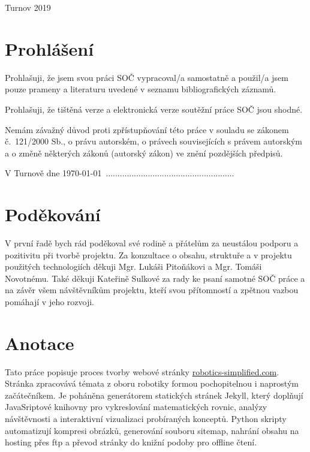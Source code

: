 \documentclass[a4paper, 12pt]{article}
\begin{document}
  \fontsize{12}{14.4} \selectfont
  Turnov 2019

  \vspace{4em}

  \newpage

  \section*{\normalfont\textbf{Prohlášení}}
  Prohlašuji, že jsem svou práci SOČ vypracoval/a samostatně a použil/a jsem pouze prameny a literaturu uvedené v seznamu bibliografických záznamů.

  Prohlašuji, že tištěná verze a elektronická verze soutěžní práce SOČ jsou shodné.

  Nemám závažný důvod proti zpřístupňování této práce v souladu se zákonem č.~121/2000 Sb., o právu autorském, o právech souvisejících s právem autorským a o změně některých zákonů (autorský zákon) ve znění pozdějších předpisů.

  \qquad

  V Turnově dne \today \, .......................................................\\%

  \newpage

  \section*{\normalfont\textbf{Poděkování}}
  V první řadě bych rád poděkoval své rodině a přátelům za neustálou podporu a pozitivitu při tvorbě projektu. Za konzultace o obsahu, struktuře a v projektu použitých technologiích děkuji Mgr. Lukáši Pitoňákovi a Mgr. Tomáši Novotnému. Také děkuji Kateřině Sulkové za rady ke psaní samotné SOČ práce a na závěr všem návštěvníkům projektu, kteří svou přítomností a zpětnou vazbou pomáhají v jeho rozvoji.

  \newpage

  \section*{\normalfont\textbf{Anotace}}
  Tato práce popisuje proces tvorby webové stránky \url{robotics-simplified.com}. Stránka zpracovává témata z oboru robotiky formou pochopitelnou i naprostým začátečníkem. Je poháněna generátorem statických stránek Jekyll, který doplňují JavaSriptové knihovny pro vykreslování matematických rovnic, analýzy návštěvnosti a interaktivní vizualizaci probíraných konceptů. Python skripty automatizují kompresi obrázků, generování souboru sitemap, nahrání obsahu na hosting přes \acrshort{ftp} a převod stránky do knižní podoby pro offline čtení.
\end{document}
